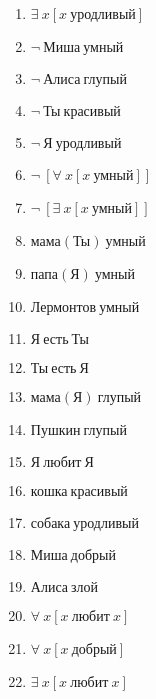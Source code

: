 \documentclass{article}
\begin{document}
\begin{enumerate}
\item $\exists \ x[x \ \text{уродливый}]$

\item $\neg \ \text{Миша} \ \text{умный}$

\item $\neg \ \text{Алиса} \ \text{глупый}$

\item $\neg \ \text{Ты} \ \text{красивый}$

\item $\neg \ \text{Я} \ \text{уродливый}$

\item $\neg \ [\forall \ x[x \ \text{умный}]]$

\item $\neg \ [\exists \ x[x \ \text{умный}]]$

\item $\text{мама}(\text{Ты}) \ \text{умный}$

\item $\text{папа}(\text{Я}) \ \text{умный}$

\item $\text{Лермонтов} \ \text{умный}$

\item $\text{Я} \ \text{есть} \ \text{Ты}$

\item $\text{Ты} \ \text{есть} \ \text{Я}$

\item $\text{мама}(\text{Я}) \ \text{глупый}$

\item $\text{Пушкин} \ \text{глупый}$

\item $\text{Я} \ \text{любит} \ \text{Я}$

\item $\text{кошка} \ \text{красивый}$

\item $\text{собака} \ \text{уродливый}$

\item $\text{Миша} \ \text{добрый}$

\item $\text{Алиса} \ \text{злой}$

\item $\forall \ x[x \ \text{любит} \ x]$

\item $\forall \ x[x \ \text{добрый}]$

\item $\exists \ x[x \ \text{любит} \ x]$


\end{enumerate}
\end{document}
